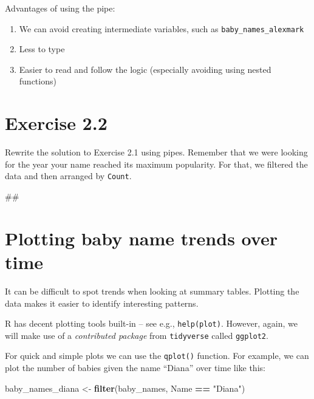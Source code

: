 \documentclass[]{book}
\newenvironment{Shaded}{\begin{snugshade}}{\end{snugshade}}
\newcommand{\KeywordTok}[1]{\textcolor[rgb]{0.13,0.29,0.53}{\textbf{#1}}}
\newcommand{\StringTok}[1]{\textcolor[rgb]{0.31,0.60,0.02}{#1}}
\newcommand{\OperatorTok}[1]{\textcolor[rgb]{0.81,0.36,0.00}{\textbf{#1}}}
\newcommand{\NormalTok}[1]{#1}
\providecommand{\tightlist}{%
  \setlength{\itemsep}{0pt}\setlength{\parskip}{0pt}}
\begin{document}
Advantages of using the pipe:

\begin{enumerate}
\def\labelenumi{\arabic{enumi}.}
\tightlist
\item
  We can avoid creating intermediate variables, such as
  \texttt{baby\_names\_alexmark}
\item
  Less to type
\item
  Easier to read and follow the logic (especially avoiding using nested
  functions)
\end{enumerate}

\section{Exercise 2.2}\label{exercise-2.2}

Rewrite the solution to Exercise 2.1 using pipes. Remember that we were
looking for the year your name reached its maximum popularity. For that,
we filtered the data and then arranged by \texttt{Count}.

\begin{Shaded}
\begin{Highlighting}[]
\NormalTok{##}
\end{Highlighting}
\end{Shaded}

\section{Plotting baby name trends over
time}\label{plotting-baby-name-trends-over-time}

It can be difficult to spot trends when looking at summary tables.
Plotting the data makes it easier to identify interesting patterns.

R has decent plotting tools built-in -- see e.g., \texttt{help(plot)}.
However, again, we will make use of a \emph{contributed package} from
\texttt{tidyverse} called \texttt{ggplot2}.

For quick and simple plots we can use the \texttt{qplot()} function. For
example, we can plot the number of babies given the name ``Diana'' over
time like this:

\begin{Shaded}
\begin{Highlighting}[]
\NormalTok{baby_names_diana <-}\StringTok{ }\KeywordTok{filter}\NormalTok{(baby_names, Name }\OperatorTok{==}\StringTok{ "Diana"}\NormalTok{)}
\end{Highlighting}
\end{Shaded}
\end{document}
